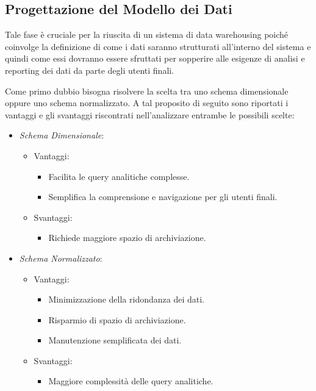 \subsection{Progettazione del Modello dei Dati}

Tale fase è cruciale per la riuscita di un sistema di data warehousing poiché coinvolge la definizione di come i dati saranno strutturati all'interno del sistema e quindi come essi dovranno essere sfruttati per sopperire alle esigenze di analisi e reporting dei dati da parte degli utenti finali.

Come primo dubbio bisogna risolvere la scelta tra uno schema dimensionale oppure uno schema normalizzato. A tal proposito di seguito sono riportati i vantaggi e gli svantaggi riscontrati nell'analizzare entrambe le possibili scelte:

\begin{itemize}
    \item \textit{Schema Dimensionale}:
        \begin{itemize}
            \item Vantaggi:
                \begin{itemize}
                    \item Facilita le query analitiche complesse.
                    \item Semplifica la comprensione e navigazione per gli utenti finali.
                \end{itemize}
            \item Svantaggi:
                \begin{itemize}
                    \item Richiede maggiore spazio di archiviazione.
                \end{itemize}
        \end{itemize}
    \item \textit{Schema Normalizzato}:
            \begin{itemize}
            \item Vantaggi:
                \begin{itemize}
                    \item Minimizzazione della ridondanza dei dati.
                    \item Risparmio di spazio di archiviazione.
                    \item Manutenzione semplificata dei dati.
                \end{itemize}
            \item Svantaggi:
                \begin{itemize}
                    \item Maggiore complessità delle query analitiche.
                \end{itemize}
        \end{itemize}
\end{itemize}

